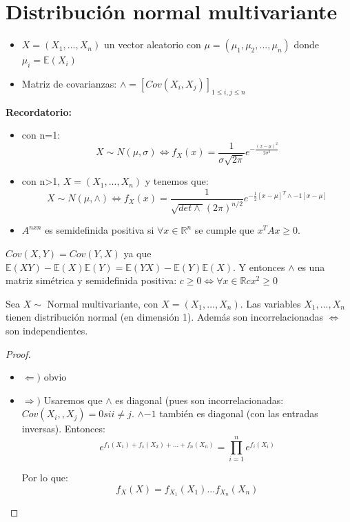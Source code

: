 \documentclass{apuntes}
\begin{document}
\section{Distribución normal multivariante}
\begin{itemize}
\item $X=(X_1,...,X_n)$ un vector aleatorio con $\mu=(\mu_1,\mu_2,...,\mu_n)$ donde $\mu_i=\mathbb{E}(X_i)$
\item Matriz de covarianzas: $\wedge=[Cov(X_i,X_j)]_{1\leq i, j\leq n}$
\end{itemize}

\textbf{Recordatorio:} 
\begin{itemize}
\item con n=1: $$X\sim N(\mu, \sigma) \Leftrightarrow f_X(x)=\frac{1}{\sigma \sqrt{2\pi}}e^{-\frac{(x-\mu)^2}{2\sigma^2}}$$
\item con n>1, $X=(X_1,...,X_n)$ y tenemos que: $$X\sim N(\mu, \wedge) \Leftrightarrow f_X(x)=\frac{1}{\sqrt{det\wedge}(2\pi)^{n/2}}e^{-\frac{1}{2}[x-\mu]^T \wedge{-1}[x-\mu]}$$
\item $A^{nxn}$ es semidefinida positiva si $\forall x \in \mathbb{R}^n$ se cumple que $x^TAx \geq 0$.
\end{itemize}

\obs $Cov(X,Y)=Cov(Y,X)$ ya que $\mathbb{E}(XY)-\mathbb{E}(X)\mathbb{E}(Y)=\mathbb{E}(YX)-\mathbb{E}(Y)\mathbb{E}(X)$. Y entonces $\wedge$ es una matriz simétrica y semidefinida positiva: $c\geq0 \Leftrightarrow \forall x \in \mathbb{R}cx^2\geq0$

\begin{theorem}
Sea $X \sim$ Normal multivariante, con $X=(X_1,...,X_n)$. Las variables $X_1,...,X_n$ tienen distribución normal (en dimensión 1). Además son incorrelacionadas $\Leftrightarrow $ son independientes.
\end{theorem}
\begin{proof}
\begin{itemize}
\item $\Leftarrow)$ obvio
\item $\Rightarrow)$ Usaremos que $\wedge$ es diagonal (pues son incorrelacionadas: $Cov(X_i,,X_j)=0 si i\neq j$. $\wedge{-1}$ también es diagonal (con las entradas inversas). Entonces:
\[
e^{f_1(X_1)+f_s(X_2)+...+f_n(X_n)}=\prod_{i=1}^{n}e^{f_i(X_i)}
\]

Por lo que:
\[
f_X(X)=f_{X_1}(X_1)...f_{X_n}(X_n)
\]
\end{itemize}
\end{proof}
\end{document}
